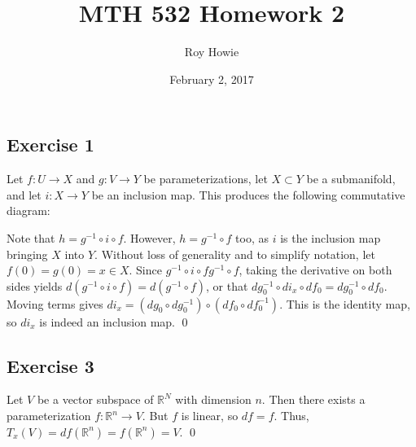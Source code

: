 \documentclass{article}
\newcommand{\R}{\mathbb{R}}
\begin{document}
\title{MTH 532 Homework 2}
\author{Roy Howie}
\date{February 2, 2017}
\maketitle

\subsection*{Exercise 1}
  Let $f\colon U\to X$ and $g\colon V\to Y$ be parameterizations, let $X\subset
  Y$ be a submanifold, and let $i\colon X\to Y$ be an inclusion map. This
  produces the following commutative diagram:
  \begin{center}
  \end{center}
  Note that $h=g^{-1}\circ i\circ f$. However, $h=g^{-1}\circ f$ too, as $i$ is
  the inclusion map bringing $X$ into $Y$. Without loss of generality and to
  simplify notation, let $f(0)=g(0)=x\in X$. Since $g^{-1}\circ i\circ f g^{-1}
  \circ f$, taking the derivative on both sides yields $d(g^{-1}\circ i\circ f)=
  d(g^{-1}\circ f)$, or that
    $dg^{-1}_0\circ di_x\circ df_0=dg^{-1}_0\circ df_0$.
  Moving terms gives $di_x=(dg_0\circ dg^{-1}_0)\circ(df_0\circ df^{-1}_0)$.
  This is the identity map, so $di_x$ is indeed an inclusion map.
  \qed

\subsection*{Exercise 3}
  Let $V$ be a vector subspace of $\R^N$ with dimension $n$. Then there exists a
  parameterization $f\colon\R^n\to V$. But $f$ is linear, so $df=f$. Thus,
  $T_x(V)=df(\R^n)=f(\R^n)=V$.
  \qed
\end{document}
